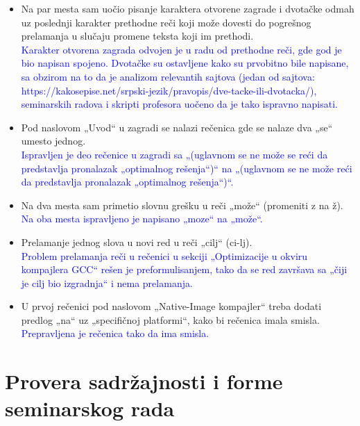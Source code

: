 \documentclass[a4paper]{report}
\newcommand{\odgovor}[1]{\textcolor{blue}{#1}}
\begin{document}
\begin{itemize}
    \item Na par mesta sam uočio pisanje karaktera otvorene zagrade i dvotačke odmah uz poslednji karakter prethodne reči koji može dovesti do pogrešnog prelamanja u slučaju promene teksta koji im prethodi.\\
         \odgovor{Karakter otvorena zagrada odvojen je u radu od prethodne reči, gde god je bio napisan spojeno. Dvotačke su ostavljene kako su prvobitno bile napisane, sa obzirom na to
                 da je analizom relevantih sajtova (jedan od sajtova: https://kakosepise.net/srpski-jezik/pravopis/dve-tacke-ili-dvotacka/), seminarskih radova i skripti profesora uočeno da je tako ispravno napisati.
         }  
    \item Pod naslovom „Uvod“ u zagradi se nalazi rečenica gde se nalaze dva „se“ umesto jednog. \\
    \odgovor{Ispravljen je deo rečenice u zagradi sa „(uglavnom se ne može  se reći da predstavlja pronalazak „optimalnog rešenja“)“ na  „(uglavnom se ne može reći da predstavlja pronalazak „optimalnog rešenja“)“. } 
    \item Na dva mesta sam primetio slovnu grešku u reči „može“ (promeniti z na ž). \\
    \odgovor{Na oba mesta ispravljeno je napisano „moze“  na „može“. }
    \item Prelamanje jednog slova u novi red u reči „cilj“ (ci-lj). \\
    \odgovor{Problem  prelamanja reči u rečenici u sekciji „Optimizacije u okviru kompajlera GCC“ rešen je preformulisanjem, tako da se red završava sa „čiji je cilj bio izgradnja“ i nema prelamanja. }
    \item U prvoj rečenici pod naslovom „Native-Image kompajler“ treba dodati predlog „na“ uz „specifičnoj platformi“, kako bi rečenica imala smisla. \\
    \odgovor{ Prepravljena je rečenica tako da ima smisla. } 
\end{itemize}


\section{Provera sadržajnosti i forme seminarskog rada}
\end{document}
